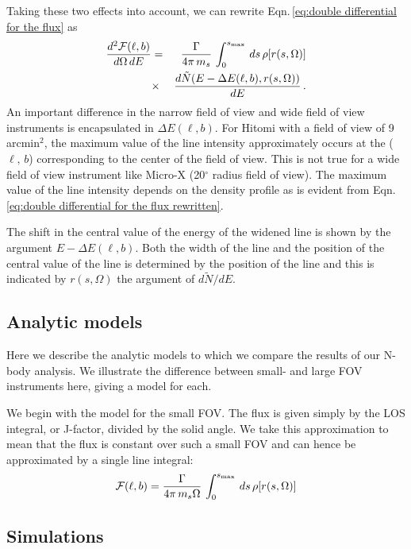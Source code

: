 \documentclass[aps,prd,10pt,twocolumn,superscriptaddress,showpacs]{revtex4-1}
\begin{document}
Taking these two effects into account, we can rewrite Eqn.\,\ref{eq:double differential for the flux} as 
\begin{eqnarray}
\dfrac{d^2 \mathcal{F} (\ell, b)}{d\Omega \, dE} &=&  \dfrac{\Gamma}{4\pi \, m_s} \, \int _0 ^{s_{\rm max}}  \, ds \, \rho[r(s, \Omega)] \nonumber\\
&\times& \dfrac{d \tilde{N}(E - \Delta E (\ell, b), r(s, \Omega))}{dE} \,.
\label{eq:double differential for the flux rewritten}
\end{eqnarray}
An important difference in the narrow field of view and wide field of view instruments is encapsulated in $\Delta E (\ell, b)$.  For Hitomi with a field of view of 9 arcmin$^2$, the maximum value of the line intensity approximately occurs at the ($\ell, \, b$) corresponding to the center of the field of view.  This is not true for a wide field of view instrument like Micro-X (20$^\circ$ radius field of view).  The maximum value of the line intensity depends on the density profile as is evident from Eqn.\,\ref{eq:double differential for the flux rewritten}.  

The shift in the central value of the energy of the widened line is shown by the argument $E - \Delta E (\ell, b)$.  Both the width of the line and the position of the central value of the line is determined by the position of the line and this is indicated by $r (s, \Omega)$ the argument of $d\tilde{N}/dE$.

\subsection{Analytic models}
\label{sec:simulations}

Here we describe the analytic models to which we compare the results of our N-body analysis. We
illustrate the difference between small- and large FOV instruments here, giving a model for each.

We begin with the model for the small FOV. The flux is given simply by the LOS integral, or
J-factor, divided by the solid angle. We take this approximation to mean that the flux is constant
over such a small FOV and can hence be approximated by a single line integral:
\begin{eqnarray}
\mathcal{F} (\ell, b) =  \frac{\Gamma}{4\pi \, m_s \Omega} \, \int _0 ^{s_{\rm max}}  \, ds \, \rho[r(s, \Omega)] 
\label{eq:lineflux}
\end{eqnarray}



\subsection{Simulations}
\label{sec:simulations}
\end{document}

